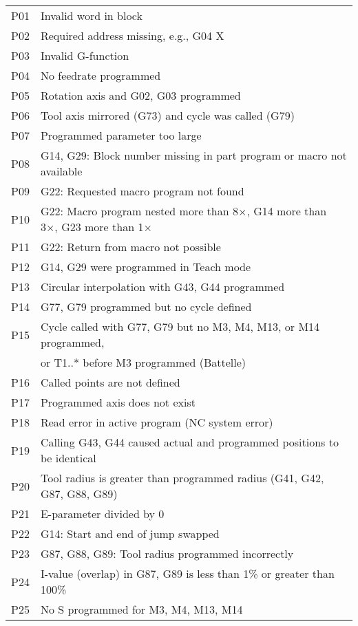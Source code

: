 \documentclass[openany,11pt]{book}
\begin{document}
\begin{table}[!h]
    \begin{tabular}{ll}
    P01 & Invalid word in block \\
    P02 & Required address missing, e.g., G04 X \\
    P03 & Invalid G-function \\
    P04 & No feedrate programmed \\
    P05 & Rotation axis and G02, G03 programmed \\
    P06 & Tool axis mirrored (G73) and cycle was called (G79) \\
    P07 & Programmed parameter too large \\
    P08 & G14, G29: Block number missing in part program or macro not available \\
    P09 & G22: Requested macro program not found \\
    P10 & G22: Macro program nested more than 8×, G14 more than 3×, G23 more than 1× \\
    P11 & G22: Return from macro not possible \\
    P12 & G14, G29 were programmed in Teach mode \\
    P13 & Circular interpolation with G43, G44 programmed \\
    P14 & G77, G79 programmed but no cycle defined \\
    P15 & Cycle called with G77, G79 but no M3, M4, M13, or M14 programmed, \\
        & or T1..* before M3 programmed (Battelle) \\
    P16 & Called points are not defined \\
    P17 & Programmed axis does not exist \\
    P18 & Read error in active program (NC system error) \\
    P19 & Calling G43, G44 caused actual and programmed positions to be identical \\
    P20 & Tool radius is greater than programmed radius (G41, G42, G87, G88, G89) \\
    P21 & E-parameter divided by 0 \\
    P22 & G14: Start and end of jump swapped \\
    P23 & G87, G88, G89: Tool radius programmed incorrectly \\
    P24 & I-value (overlap) in G87, G89 is less than 1\% or greater than 100\% \\
    P25 & No S programmed for M3, M4, M13, M14 \\

\end{tabular}
\end{table}
\end{document}
